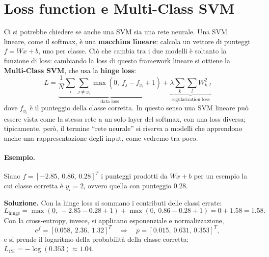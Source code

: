 \section{Loss function e Multi-Class SVM}
Ci si potrebbe chiedere se anche una SVM sia una rete neurale. Una SVM lineare, come il softmax, è una \textbf{macchina lineare}: calcola un vettore di punteggi $f = Wx + b$, uno per classe. Ciò che cambia tra i due modelli è soltanto la funzione di loss: cambiando la loss di questo framework lineare si ottiene la \textbf{Multi-Class SVM}, che usa la \textbf{hinge loss}:
\[
L = \underbrace{\frac{1}{N}\sum_{i}\sum_{j \neq y_i}\max(0,\ f_j - f_{y_i} + 1)}_{\text{data loss}} + \underbrace{\lambda\sum_{k}\sum_{l}W_{k,l}^2}_{\text{regularization loss}}
\]
dove $f_{y_i}$ è il punteggio della classe corretta. In questo senso una SVM lineare può essere vista come la stessa rete a un solo layer del softmax, con una loss diversa; tipicamente, però, il termine ``rete neurale'' si riserva a modelli che apprendono anche una rappresentazione degli input, come vedremo tra poco.

\paragraph{Esempio.}
Siano $f = [-2.85,\ 0.86,\ 0.28]^T$ i punteggi prodotti da $Wx + b$ per un esempio la cui classe corretta è $y_i = 2$, ovvero quella con punteggio $0.28$.

\textbf{Soluzione.} Con la hinge loss si sommano i contributi delle classi errate:
\[
L_{\text{hinge}} = \max(0,\ -2.85 - 0.28 + 1) + \max(0,\ 0.86 - 0.28 + 1) = 0 + 1.58 = 1.58.
\]
Con la cross-entropy, invece, si applicano esponenziale e normalizzazione,
\[
e^{f} = [0.058,\ 2.36,\ 1.32]^T \quad\Longrightarrow\quad p = [0.015,\ 0.631,\ 0.353]^T,
\]
e si prende il logaritmo della probabilità della classe corretta: $L_{\text{CE}} = -\log(0.353) \approx 1.04$.

